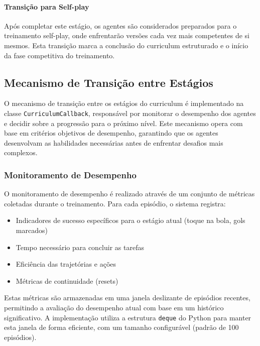 \paragraph{Transição para Self-play}

Após completar este estágio, os agentes são considerados preparados para o treinamento self-play, onde enfrentarão versões cada vez mais competentes de si mesmos. Esta transição marca a conclusão do curriculum estruturado e o início da fase competitiva do treinamento.

\subsection{Mecanismo de Transição entre Estágios}
\label{subsec:mecanismo_transicao}

O mecanismo de transição entre os estágios do curriculum é implementado na classe \texttt{CurriculumCallback}, responsável por monitorar o desempenho dos agentes e decidir sobre a progressão para o próximo nível. Este mecanismo opera com base em critérios objetivos de desempenho, garantindo que os agentes desenvolvam as habilidades necessárias antes de enfrentar desafios mais complexos.

\subsubsection{Monitoramento de Desempenho}

O monitoramento de desempenho é realizado através de um conjunto de métricas coletadas durante o treinamento. Para cada episódio, o sistema registra:

\begin{itemize}
    \item Indicadores de sucesso específicos para o estágio atual (toque na bola, gols marcados)
    \item Tempo necessário para concluir as tarefas
    \item Eficiência das trajetórias e ações
    \item Métricas de continuidade (resets)
\end{itemize}

Estas métricas são armazenadas em uma janela deslizante de episódios recentes, permitindo a avaliação do desempenho atual com base em um histórico significativo. A implementação utiliza a estrutura \texttt{deque} do Python para manter esta janela de forma eficiente, com um tamanho configurável (padrão de 100 episódios).

